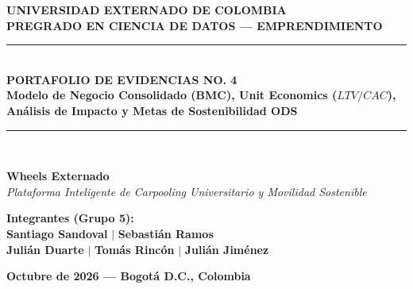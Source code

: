 \documentclass[11pt,a4paper]{article}
\begin{document}
\begin{titlepage}
    \centering
    \vspace*{0.5cm}
    {\Huge \textbf{\color{primary} UNIVERSIDAD EXTERNADO DE COLOMBIA}}\\[0.3cm]
    {\Large \textbf{\color{secondary} PREGRADO EN CIENCIA DE DATOS --- EMPRENDIMIENTO}}\\[1.5cm]
    
    \rule{\linewidth}{0.8mm}\\[0.4cm]
    {\Huge \textbf{PORTAFOLIO DE EVIDENCIAS NO. 4}}\\[0.3cm]
    {\Large \textbf{Modelo de Negocio Consolidado (BMC), Unit Economics ($LTV/CAC$),\\An\'alisis de Impacto y Metas de Sostenibilidad ODS}}\\[0.4cm]
    \rule{\linewidth}{0.8mm}\\[1.2cm]
    
    \begin{tcolorbox}[colback=primary!5,colframe=primary,arc=4mm,boxrule=1.5pt]
        \centering \huge \color{primary}
        \textbf{Wheels Externado} \\[0.2cm]
        \large \color{darkgray}
        \textit{Plataforma Inteligente de Carpooling Universitario y Movilidad Sostenible}
    \end{tcolorbox}
    
    \vfill
    
    \begin{minipage}{0.85\textwidth}
        \centering
        \textbf{\large Integrantes (Grupo 5):}\\[0.35cm]
        \textbf{Santiago Sandoval} \quad $\vert$ \quad \textbf{Sebasti\'an Ramos}\\[0.15cm]
        \textbf{Juli\'an Duarte} \quad $\vert$ \quad \textbf{Tom\'as Rinc\'on} \quad $\vert$ \quad \textbf{Juli\'an Jim\'enez}
    \end{minipage}
    
    \vfill
    {\large \textbf{Octubre de 2026 --- Bogot\'a D.C., Colombia}}
\end{titlepage}

\newpage
\tableofcontents
\newpage

\end{document}
